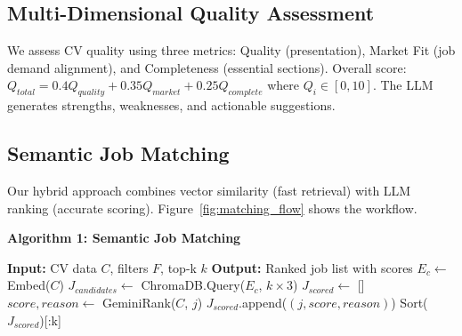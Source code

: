 \documentclass[conference]{IEEEtran}
\begin{document}
\subsection{Multi-Dimensional Quality Assessment}

We assess CV quality using three metrics: Quality (presentation), Market Fit (job demand alignment), and Completeness (essential sections). Overall score: $Q_{total} = 0.4Q_{quality} + 0.35Q_{market} + 0.25Q_{complete}$ where $Q_i \in [0, 10]$. The LLM generates strengths, weaknesses, and actionable suggestions.

\subsection{Semantic Job Matching}

Our hybrid approach combines vector similarity (fast retrieval) with LLM ranking (accurate scoring). Figure~\ref{fig:matching_flow} shows the workflow.

\textbf{Algorithm 1: Semantic Job Matching}
\begin{algorithmic}
\STATE \textbf{Input:} CV data $C$, filters $F$, top-k $k$
\STATE \textbf{Output:} Ranked job list with scores
\STATE $E_c \leftarrow$ Embed($C$)
\STATE $J_{candidates} \leftarrow$ ChromaDB.Query($E_c$, $k \times 3$)
\STATE $J_{scored} \leftarrow$ []
    \STATE $score, reason \leftarrow$ GeminiRank($C$, $j$)
    \STATE $J_{scored}$.append($(j, score, reason)$)
\ENDFOR
\RETURN Sort($J_{scored}$)[:k]
\end{algorithmic}
\end{document}
